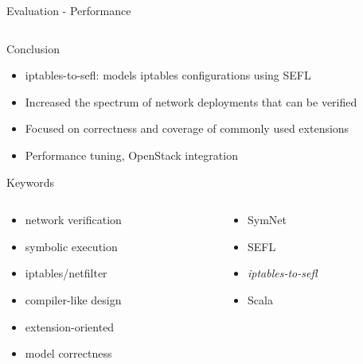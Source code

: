 \documentclass{beamer}
\begin{document}
\begin{frame}{Evaluation - Performance}
\begin{columns}
\begin{column}{.5\textwidth}
    \end{column}
  \end{columns}
\end{frame}

\begin{frame}{Conclusion}
  \begin{itemize}
    \item iptables-to-sefl: models iptables configurations using SEFL
    \pause
    \item Increased the spectrum of network deployments that can be verified
    \pause
    \item Focused on correctness and coverage of commonly used extensions
    \pause
    \item Performance tuning, OpenStack integration
  \end{itemize}
\end{frame}

\begin{frame}{Keywords}
\begin{columns}
  \begin{column}{0.5\textwidth}
    \centering
    \begin{itemize}
      \item network verification
      \item symbolic execution
      \item iptables/netfilter
      \item compiler-like design
      \item extension-oriented
      \item model correctness
    \end{itemize}
  \end{column}
  \begin{column}{0.5\textwidth}
    \centering
    \begin{itemize}
      \item SymNet
      \item SEFL
      \item \emph{iptables-to-sefl}
      \item Scala
    \end{itemize}
  \end{column}
\end{columns}
\end{frame}
\end{document}
